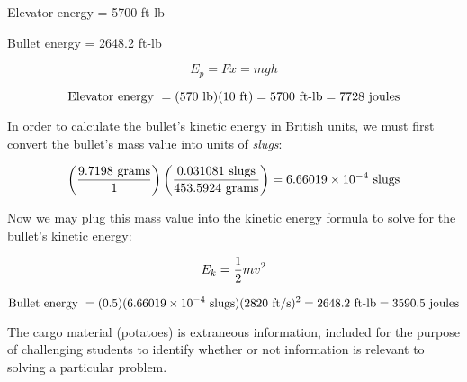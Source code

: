 Elevator energy = 5700 ft-lb

\vskip 10pt

Bullet energy = 2648.2 ft-lb







$$E_p = F x = mgh$$

$$\hbox{Elevator energy } = (570 \hbox{ lb})(10 \hbox{ ft}) = 5700 \hbox{ ft-lb} = 7728 \hbox{ joules}$$

\vskip 10pt

In order to calculate the bullet's kinetic energy in British units, we must first convert the bullet's mass value into units of {\it slugs}:

$$\left({9.7198 \hbox{ grams} \over 1}\right) \left({0.031081 \hbox{ slugs} \over 453.5924 \hbox{ grams}}\right) = 6.66019 \times 10^{-4} \hbox{ slugs}$$

Now we may plug this mass value into the kinetic energy formula to solve for the bullet's kinetic energy:

$$E_k = {1 \over 2} m v^2$$

$$\hbox{Bullet energy } = (0.5) (6.66019 \times 10^{-4} \hbox{ slugs}) (2820 \hbox{ ft/s})^2 = 2648.2 \hbox{ ft-lb} = 3590.5 \hbox{ joules}$$

\vskip 10pt

The cargo material (potatoes) is extraneous information, included for the purpose of challenging students to identify whether or not information is relevant to solving a particular problem.




